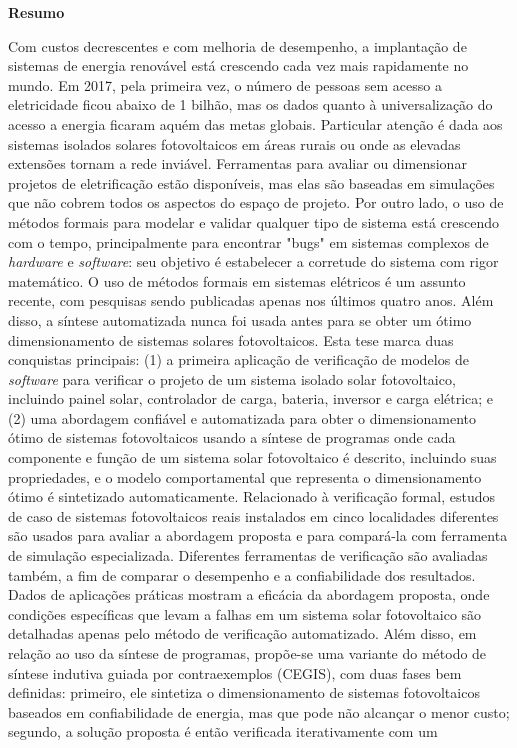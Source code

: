 \thispagestyle{plain}
\begin{center}
%    
%    
%    
    \vspace{0.9cm}
    \textbf{Resumo}
\end{center}
Com custos decrescentes e com melhoria de desempenho, a implantação de sistemas de energia renovável está crescendo cada vez mais rapidamente no mundo. Em 2017, pela primeira vez, o número de pessoas sem acesso a eletricidade ficou abaixo de 1 bilhão, mas os dados quanto à universalização do acesso a energia ficaram aquém das metas globais. Particular atenção é dada aos sistemas isolados solares fotovoltaicos em áreas rurais ou onde as elevadas extensões tornam a rede inviável. Ferramentas para avaliar ou dimensionar projetos de eletrificação estão disponíveis, mas elas são baseadas em simulações que não cobrem todos os aspectos do espaço de projeto. Por outro lado, o uso de métodos formais para modelar e validar qualquer tipo de sistema está crescendo com o tempo, principalmente para encontrar "bugs" em sistemas complexos de \textit{hardware} e \textit{software}: seu objetivo é estabelecer a corretude do sistema com rigor matemático. O uso de métodos formais em sistemas elétricos é um assunto recente, com pesquisas sendo publicadas apenas nos últimos quatro anos. Além disso, a síntese automatizada nunca foi usada antes para se obter um ótimo dimensionamento de sistemas solares fotovoltaicos. Esta tese marca duas conquistas principais: (1) a primeira aplicação de verificação de modelos de \textit{software} para verificar o projeto de um sistema isolado solar fotovoltaico, incluindo painel solar, controlador de carga, bateria, inversor e carga elétrica; e (2) uma abordagem confiável e automatizada para obter o dimensionamento ótimo de sistemas fotovoltaicos usando a síntese de programas onde cada componente e função de um sistema solar fotovoltaico é descrito, incluindo suas propriedades, e o modelo comportamental que representa o dimensionamento ótimo é sintetizado automaticamente. Relacionado à verificação formal, estudos de caso de sistemas fotovoltaicos reais instalados em cinco localidades diferentes são usados para avaliar a abordagem proposta e para compará-la com ferramenta de simulação especializada. Diferentes ferramentas de verificação são avaliadas também, a fim de comparar o desempenho e a confiabilidade dos resultados. Dados de aplicações práticas mostram a eficácia da abordagem proposta, onde condições específicas que levam a falhas em um sistema solar fotovoltaico são detalhadas apenas pelo método de verificação automatizado. Além disso, em relação ao uso da síntese de programas, propõe-se uma variante do método de síntese indutiva guiada por contraexemplos (CEGIS), com duas fases bem definidas: primeiro, ele sintetiza o dimensionamento de sistemas fotovoltaicos baseados em confiabilidade de energia, mas que pode não alcançar o menor custo; segundo, a solução proposta é então verificada iterativamente com um 